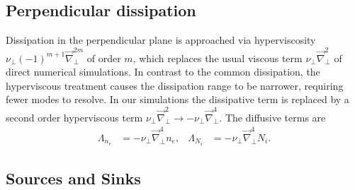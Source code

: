 \subsection{Perpendicular dissipation}
Dissipation in the perpendicular plane is approached via hyperviscosity \(\nu_\perp(-1)^{m+1}\vec{\nabla}_\perp^{2m}\) of order \(m\), which replaces the usual viscous term 
\(\nu_\perp \vec{\nabla}_\perp^2\) of direct numerical simulations. In contrast to the common dissipation, the hyperviscous treatment causes the dissipation range to be narrower, 
requiring fewer modes to resolve.
In our simulations the dissipative term is replaced by a second order hyperviscous term \(\nu_\perp \vec{\nabla}_\perp^2 \rightarrow -\nu_\perp \vec{\nabla}_\perp^4 \). The diffusive terms are
\begin{align}\label{eq:perpdiffn}
 \Lambda_{n_e} &=  -\nu_\perp \vec{\nabla}_\perp^4 n_e, &
 \Lambda_{N_i} &=  -\nu_\perp \vec{\nabla}_\perp^4 N_i.
\end{align}
\subsection{Sources and Sinks}
